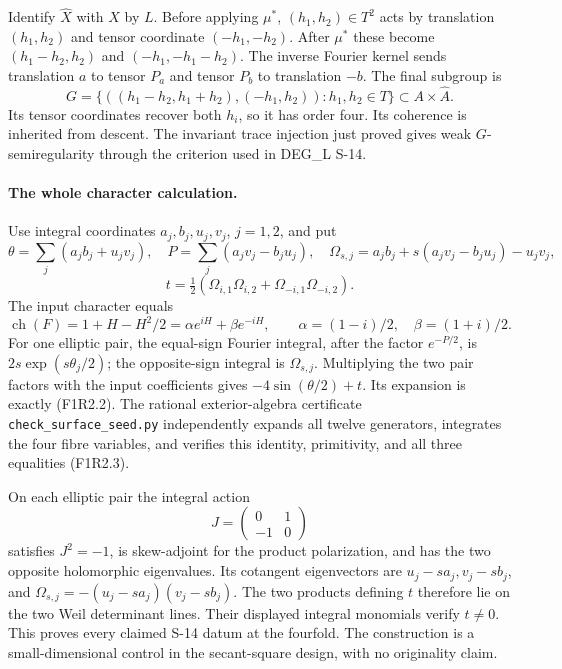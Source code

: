 Identify $\widehat X$ with $X$ by $L$. Before applying $\mu^*$,
$(h_1,h_2)\in T^2$ acts by translation $(h_1,h_2)$ and tensor
coordinate $(-h_1,-h_2)$. After $\mu^*$ these become
$(h_1-h_2,h_2)$ and $(-h_1,-h_1-h_2)$.
The inverse Fourier kernel sends translation $a$ to tensor $P_a$
and tensor $P_b$ to translation $-b$. The final subgroup is
\[
 G=\{((h_1-h_2,h_1+h_2),(-h_1,h_2)):h_1,h_2\in T\}
                              \subset A\times\widehat A.
 \tag{F1R2.5}
\]
Its tensor coordinates recover both $h_i$, so it has order four.
Its coherence is inherited from descent. The invariant trace
injection just proved gives weak $G$-semiregularity through the
criterion used in DEG\_L S-14.

\paragraph{The whole character calculation.}
Use integral coordinates $a_j,b_j,u_j,v_j$, $j=1,2$, and put
\[
 \theta=\sum_j(a_jb_j+u_jv_j),\quad P=\sum_j(a_jv_j-b_ju_j),
 \quad\Omega_{s,j}=a_jb_j+s(a_jv_j-b_ju_j)-u_jv_j,
\]
\[
 t=\tfrac12(\Omega_{i,1}\Omega_{i,2}
                        +\Omega_{-i,1}\Omega_{-i,2}).
\]
The input character equals
\[
 \operatorname{ch}(F)=1+H-H^2/2
       =\alpha e^{iH}+\beta e^{-iH},\qquad
 \alpha=(1-i)/2,\quad\beta=(1+i)/2.
\]
For one elliptic pair, the equal-sign Fourier integral, after
the factor $e^{-P/2}$, is $2s\exp(s\theta_j/2)$; the opposite-sign
integral is $\Omega_{s,j}$. Multiplying the two pair factors with
the input coefficients gives $-4\sin(\theta/2)+t$. Its expansion
is exactly (F1R2.2). The rational exterior-algebra certificate
\texttt{check\_surface\_seed.py} independently expands all twelve
generators, integrates the four fibre variables, and verifies this
identity, primitivity, and all three equalities (F1R2.3).

On each elliptic pair the integral action
\[
                   J=\begin{pmatrix}0&1\\-1&0\end{pmatrix}
\]
satisfies $J^2=-1$, is skew-adjoint for the product polarization,
and has the two opposite holomorphic eigenvalues. Its cotangent
eigenvectors are $u_j-sa_j,v_j-sb_j$, and
$\Omega_{s,j}=-(u_j-sa_j)(v_j-sb_j)$.
The two products defining $t$ therefore lie on the two Weil
determinant lines. Their displayed integral monomials verify
$t\ne0$. This proves every claimed S-14 datum at the fourfold.
The construction is a small-dimensional control in the secant-square
design, with no originality claim.

